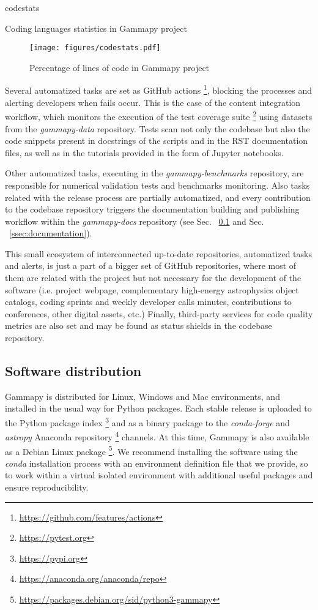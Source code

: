 \begin{table}
	{codestats}
	\caption{Coding languages statistics in Gammapy project}
	\label{table:codestats:data}
\end{table}

\begin{figure}[t]
	\centering
	\texttt{[image: figures/codestats.pdf]}
	\caption{
		Percentage of lines of code in Gammapy project} \label{fig:codestats:lang}
\end{figure}

Several automatized tasks are set as GitHub actions \footnote{\url{https://github.com/features/actions}}, blocking the processes and alerting developers when fails occur. This is the case of the content integration workflow, which monitors the execution of the test coverage suite \footnote{\url{https://pytest.org}} using datasets from the \textit{gammapy-data} repository. Tests scan not only the codebase but also the code snippets present in docstrings of the scripts and in the RST documentation files, as well as in the tutorials provided in the form of Jupyter notebooks. 

Other automatized tasks, executing in the \textit{gammapy-benchmarks} repository, are responsible for numerical validation tests and benchmarks monitoring. Also tasks related with the release process are partially automatized, and every contribution to the codebase repository triggers the documentation building and publishing workflow within the \textit{gammapy-docs} repository (see Sec. ~\ref{ssec:software-distribution} and Sec. ~\ref{ssec:documentation}).

This small ecosystem of interconnected up-to-date repositories, automatized tasks and alerts, is just a part of a bigger set of GitHub repositories, where most of them are related with the project but not necessary for the development of the software (i.e. project webpage, complementary high-energy astrophysics object catalogs, coding sprints and weekly developer calls minutes, contributions to conferences, other digital assets, etc.) Finally, third-party services for code quality metrics are also set and may be found as status shields in the codebase repository.

\subsection{Software distribution}
\label{ssec:software-distribution}

Gammapy is distributed for Linux, Windows and Mac environments, and installed in the usual way for Python packages. Each stable release is uploaded to the Python package index \footnote{\url{https://pypi.org}} and as a binary package to the \textit{conda-forge} and \textit{astropy} Anaconda repository \footnote{\url{https://anaconda.org/anaconda/repo}} channels. At this time, Gammapy is also available as a Debian Linux package \footnote{\url{https://packages.debian.org/sid/python3-gammapy}}. We recommend installing the software using the \textit{conda} installation process with an environment definition file that we provide, so to work within a virtual isolated environment with additional useful packages and ensure reproducibility. 

